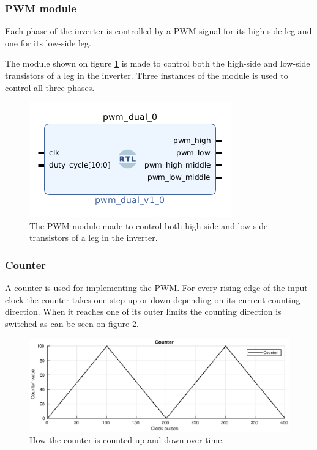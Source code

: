 \subsubsection{PWM module}

Each phase of the inverter is controlled by a PWM signal for its high-side leg and one for its low-side leg. 

The module shown on figure \ref{fig:pwm_module} is made to control both the high-side and low-side transistors of a leg in the inverter. Three instances of the module is used to control all three phases.
\begin{figure}[H]
	\centering
	\includegraphics[width=0.5 \textwidth]{pictures/software/pwm_module.png}
	\caption{The PWM module made to control both high-side and low-side transistors of a leg in the inverter.}
	\label{fig:pwm_module}
\end{figure}



\subsubsection*{Counter}
A counter is used for implementing the PWM. For every rising edge of the input clock the counter takes one step up or down depending on its current counting direction. When it reaches one of its outer limits the counting direction is switched as can be seen on figure \ref{fig:counter}.

\begin{figure}[H]
	\centering
	\includegraphics[width=1 \textwidth]{pictures/software/counter.eps}
	\caption{How the counter is counted up and down over time.}
	\label{fig:counter}
\end{figure}

